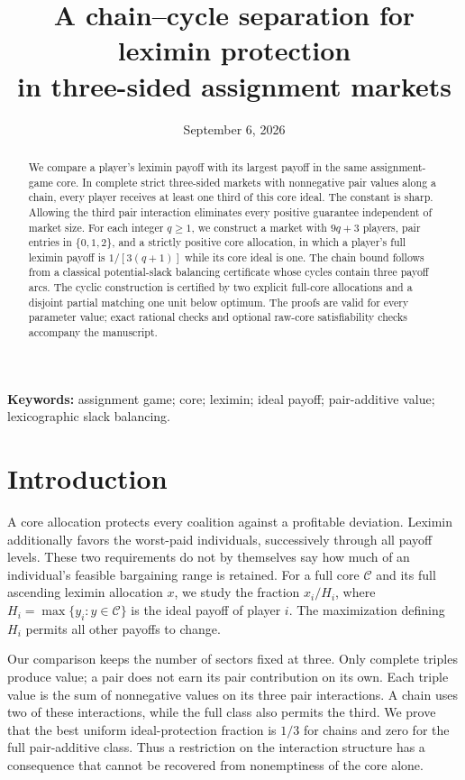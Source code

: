 \documentclass[11pt]{article}
\title{A chain--cycle separation for leximin protection\\in three-sided assignment markets}
\author{}
\date{September 6, 2026}
\theoremstyle{remark}\newtheorem{remark}[theorem]{Remark}
\newcommand{\core}{\mathcal C}
\begin{document}
\maketitle
\begin{abstract}
We compare a player's leximin payoff with its largest payoff in the same
assignment-game core. In complete strict three-sided markets with nonnegative
pair values along a chain, every player receives at least one third of this
core ideal. The constant is sharp. Allowing the third pair interaction
eliminates every positive guarantee independent of market size. For each
integer $q\geq1$, we construct a market with $9q+3$ players, pair entries in
$\{0,1,2\}$, and a strictly positive core allocation, in which a player's
full leximin payoff is $1/[3(q+1)]$ while its core ideal is one. The chain
bound follows from a classical potential-slack balancing certificate whose
cycles contain three payoff arcs. The cyclic construction is certified by
two explicit full-core allocations and a disjoint partial matching one unit
below optimum. The proofs are valid for every parameter value; exact rational
checks and optional raw-core satisfiability checks accompany the manuscript.
\end{abstract}

\noindent\textbf{Keywords:} assignment game; core; leximin; ideal payoff;
pair-additive value; lexicographic slack balancing.

\section{Introduction}
A core allocation protects every coalition against a profitable deviation.
Leximin additionally favors the worst-paid individuals, successively through
all payoff levels. These two requirements do not by themselves say how much
of an individual's feasible bargaining range is retained. For a full core
$\core$ and its full ascending leximin allocation $x$, we study the fraction
$x_i/H_i$, where $H_i=\max\{y_i:y\in\core\}$ is the ideal payoff of player $i$.
The maximization defining $H_i$ permits all other payoffs to change.

Our comparison keeps the number of sectors fixed at three. Only complete
triples produce value; a pair does not earn its pair contribution on its own.
Each triple value is the sum of nonnegative values on its three pair
interactions. A chain uses two of these interactions, while the full class
also permits the third. We prove that the best uniform ideal-protection
fraction is $1/3$ for chains and zero for the full pair-additive class.
Thus a restriction on the interaction structure has a consequence that
cannot be recovered from nonemptiness of the core alone.
\end{document}
